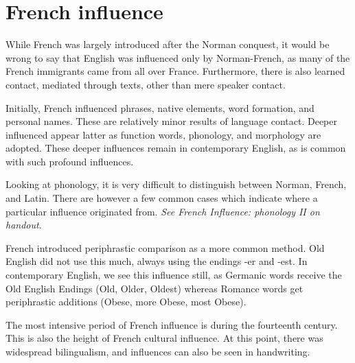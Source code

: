 \documentclass[12pt]{report}
\begin{document}
\section{French influence}

While French was largely introduced after the Norman conquest, it would be wrong
to say that English was influenced only by Norman-French, as many of the French
immigrants came from all over France. Furthermore, there is also learned
contact, mediated through texts, other than mere speaker contact.

Initially, French influenced phrases, native elements, word formation, and
personal names. These are relatively minor results of language contact. Deeper
influenced appear latter as function words, phonology, and morphology are
adopted. These deeper influences remain in contemporary English, as is common
with such profound influences.

Looking at phonology, it is very difficult to distinguish between Norman,
French, and Latin. There are however a few common cases which indicate where a
particular influence originated from. \textit{See French Influence: phonology II
on handout}. 

French introduced periphrastic comparison as a more common method. Old English
did not use this much, always using the endings -er and -est. In contemporary
English, we see this influence still, as Germanic words receive the Old English
Endings (Old, Older, Oldest) whereas Romance words get periphrastic additions
(Obese, more Obese, most Obese).

The most intensive period of French influence is during the fourteenth century.
This is also the height of French cultural influence. At this point, there was
widespread bilingualism, and influences can also be seen in handwriting.
\end{document}
